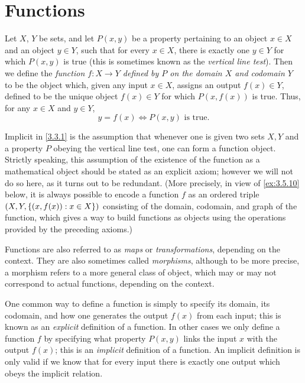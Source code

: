 \section{Functions}\label{sec:3.3}

\begin{defn}[Functions]\label{3.3.1}
  Let \(X\), \(Y\) be sets, and let \(P(x, y)\) be a property pertaining to an object \(x \in X\) and an object \(y \in Y\), such that for every \(x \in X\), there is exactly one \(y \in Y\) for which \(P(x, y)\) is true (this is sometimes known as the \emph{vertical line test}).
  Then we define the \emph{function \(f : X \to Y\) defined by \(P\) on the domain \(X\) and codomain \(Y\)} to be the object which, given any input \(x \in X\), assigns an output \(f(x) \in Y\), defined to be the unique object \(f(x) \in Y\) for which \(P(x, f(x))\) is true.
  Thus, for any \(x \in X\) and \(y \in Y\),
  \[
    y = f(x) \iff P(x, y) \text{ is true}.
  \]
\end{defn}

\begin{note}
  Implicit in \cref{3.3.1} is the assumption that whenever one is given two sets \(X, Y\) and a property \(P\) obeying the vertical line test, one can form a function object.
  Strictly speaking, this assumption of the existence of the function as a mathematical object should be stated as an explicit axiom;
  however we will not do so here, as it turns out to be redundant.
  (More precisely, in view of \cref{ex:3.5.10} below, it is always possible to encode a function \(f\) as an ordered triple \((X, Y, \left\lbrace(x, f(x)) : x \in X\right\rbrace)\) consisting of the domain, codomain, and graph of the function, which gives a way to build functions as objects using the operations provided by the preceding axioms.)
\end{note}

\begin{note}
  Functions are also referred to as \emph{maps} or \emph{transformations}, depending on the context.
  They are also sometimes called \emph{morphisms}, although to be more precise, a morphism refers to a more general class of object, which may or may not correspond to actual functions, depending on the context.
\end{note}

\begin{note}
  One common way to define a function is simply to specify its domain, its codomain, and how one generates the output \(f(x)\) from each input;
  this is known as an \emph{explicit} definition of a function.
  In other cases we only define a function \(f\) by specifying what property \(P(x, y)\) links the input \(x\) with the output \(f(x)\);
  this is an \emph{implicit} definition of a function.
  An implicit definition is only valid if we know that for every input there is exactly one output which obeys the implicit relation.
\end{note}


